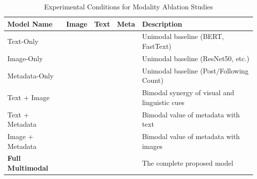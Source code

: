 \begin{table}[H]
	\centering
	\caption{Experimental Conditions for Modality Ablation Studies}
	\label{tab:ablation_conditions}
	\begin{tabularx}{\textwidth}{l c c c X} 
		\hline
		\textbf{Model Name} & \textbf{Image} & \textbf{Text} & \textbf{Meta} & \textbf{Description} \\ \hline
		Text-Only & & \checkmark & & Unimodal baseline (BERT, FastText) \\
		Image-Only & \checkmark & & & Unimodal baseline (ResNet50, etc.) \\
		Metadata-Only & & & \checkmark & Unimodal baseline (Post/Following Count) \\
		Text + Image & \checkmark & \checkmark & & Bimodal synergy of visual and linguistic cues \\
		Text + Metadata & & \checkmark & \checkmark & Bimodal value of metadata with text \\
		Image + Metadata & \checkmark & & \checkmark & Bimodal value of metadata with images \\
		\textbf{Full Multimodal} & \checkmark & \checkmark & \checkmark & The complete proposed model \\ \hline
	\end{tabularx}
\end{table}